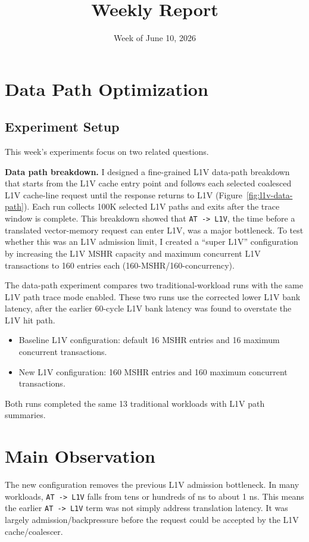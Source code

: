 \documentclass[sigconf,screen,review]{acmart}
\title{Weekly Report}
\subtitle{Week of June 10, 2026}
\begin{document}
\maketitle

\section{Data Path Optimization}

\subsection{Experiment Setup}

This week's experiments focus on two related questions.

\textbf{Data path breakdown.}  I designed a fine-grained L1V data-path
breakdown that starts from the L1V cache entry point and follows each selected
coalesced L1V cache-line request until the response returns to L1V
(Figure~\ref{fig:l1v-data-path}).  Each run collects 100K selected L1V paths
and exits after the trace window is complete.  This breakdown showed that
\texttt{AT -> L1V}, the time before a translated vector-memory request can
enter L1V, was a major bottleneck.  To test whether this was an L1V admission
limit, I created a ``super L1V'' configuration by increasing the L1V MSHR
capacity and maximum concurrent L1V transactions to 160 entries each
(160-MSHR/160-concurrency).

The data-path experiment compares two traditional-workload runs with the same
L1V path trace mode enabled.  These two runs use the corrected lower L1V bank
latency, after the earlier 60-cycle L1V bank latency was found to overstate the
L1V hit path.

\begin{itemize}
  \item Baseline L1V configuration: default 16 MSHR entries and 16 maximum
  concurrent transactions.
  \item New L1V configuration: 160 MSHR entries and 160 maximum concurrent
  transactions.
\end{itemize}

Both runs completed the same 13 traditional workloads with L1V path summaries.

\section{Main Observation}

The new configuration removes the previous L1V admission bottleneck.  In many
workloads, \texttt{AT -> L1V} falls from tens or hundreds of ns to about 1 ns.
This means the earlier \texttt{AT -> L1V} term was not simply address
translation latency.  It was largely admission/backpressure before the request
could be accepted by the L1V cache/coalescer.
\end{document}
